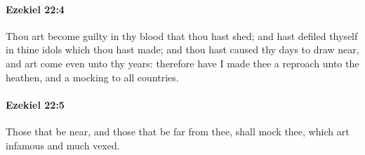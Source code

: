 		\paragraph{Ezekiel 22:4} %
			\label{EZEKIEL-22-4}

			Thou art become guilty in thy blood that thou hast shed; and hast defiled thyself in thine idols which thou hast made; and thou hast caused thy days to draw near, and art come even unto thy years: therefore have I made thee a reproach unto the heathen, and a mocking to all countries.


		\paragraph{Ezekiel 22:5} %
			\label{EZEKIEL-22-5}

			Those that be near, and those that be far from thee, shall mock thee, which art infamous and much vexed.

